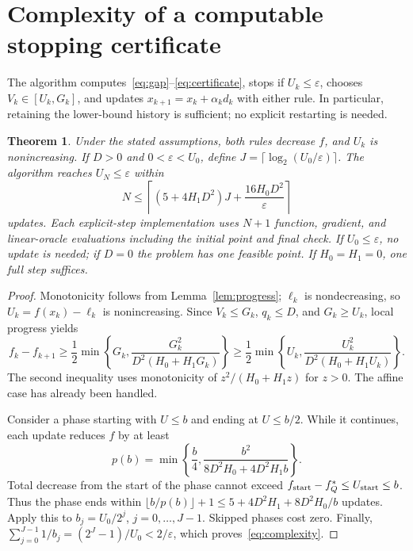 \documentclass[11pt]{article}
\newtheorem{theorem}{Theorem}
\begin{document}
\section{Complexity of a computable stopping certificate}
The algorithm computes~\eqref{eq:gap}--\eqref{eq:certificate}, stops if
$U_k\le\varepsilon$, chooses $V_k\in[U_k,G_k]$, and updates
$x_{k+1}=x_k+\alpha_kd_k$ with either rule. In particular, retaining
the lower-bound history is sufficient; no explicit restarting is needed.

\begin{theorem}\label{thm:main}
Under the stated assumptions, both rules decrease $f$, and $U_k$ is
nonincreasing. If $D>0$ and $0<\varepsilon<U_0$, define
$J=\lceil\log_2(U_0/\varepsilon)\rceil$. The algorithm reaches
$U_N\le\varepsilon$ within
\begin{equation}\label{eq:complexity}
 N\le\left\lceil(5+4H_1D^2)J+\frac{16H_0D^2}{\varepsilon}\right\rceil
\end{equation}
updates. Each explicit-step implementation uses $N+1$ function, gradient,
and linear-oracle evaluations including the initial point and final check.
If $U_0\le\varepsilon$, no update is needed; if $D=0$ the problem has one
feasible point. If $H_0=H_1=0$, one full step suffices.
\end{theorem}
\begin{proof}
Monotonicity follows from Lemma~\ref{lem:progress}; $\ell_k$ is nondecreasing,
so $U_k=f(x_k)-\ell_k$ is nonincreasing. Since $V_k\le G_k$, $q_k\le D$,
and $G_k\ge U_k$, local progress yields
\begin{equation}\label{eq:certificateprogress}
 f_k-f_{k+1}\ge\frac12\min\left\{G_k,
 \frac{G_k^2}{D^2(H_0+H_1G_k)}\right\}
 \ge\frac12\min\left\{U_k,
 \frac{U_k^2}{D^2(H_0+H_1U_k)}\right\}.
\end{equation}
The second inequality uses monotonicity of $z^2/(H_0+H_1z)$ for $z>0$.
The affine case has already been handled.

Consider a phase starting with $U\le b$ and ending at $U\le b/2$.
While it continues, each update reduces $f$ by at least
\[
 p(b)=\min\left\{\frac b4,
       \frac{b^2}{8D^2H_0+4D^2H_1b}\right\}.
\]
Total decrease from the start of the phase cannot exceed
$f_{\rm start}-f_Q^*\le U_{\rm start}\le b$. Thus the phase ends within
$\lfloor b/p(b)\rfloor+1\le5+4D^2H_1+8D^2H_0/b$ updates.
Apply this to $b_j=U_0/2^j$, $j=0,\ldots,J-1$. Skipped phases cost zero.
Finally,
$\sum_{j=0}^{J-1}1/b_j=(2^J-1)/U_0<2/\varepsilon$,
which proves~\eqref{eq:complexity}.
\end{proof}
\end{document}
